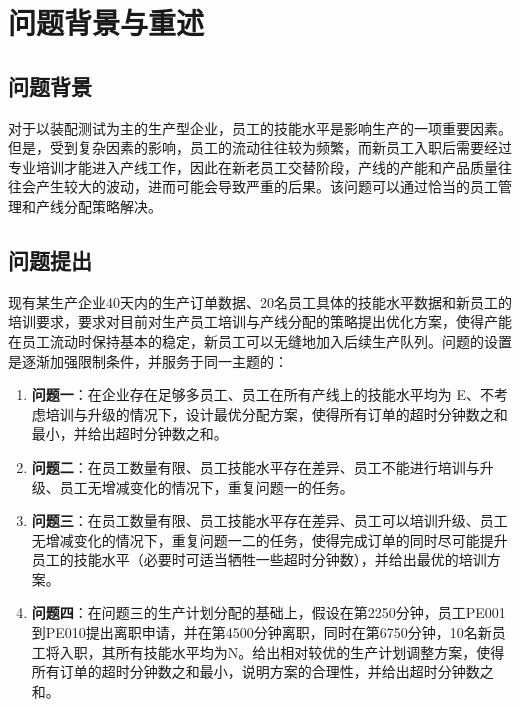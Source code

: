 \section{问题背景与重述}

\subsection{问题背景}
对于以装配测试为主的生产型企业，员工的技能水平是影响生产的一项重要因素。但是，受到复杂因素的影响，员工的流动往往较为频繁，而新员工入职后需要经过专业培训才能进入产线工作，因此在新老员工交替阶段，产线的产能和产品质量往往会产生较大的波动，进而可能会导致严重的后果。该问题可以通过恰当的员工管理和产线分配策略解决。

\subsection{问题提出}
现有某生产企业40天内的生产订单数据、20名员工具体的技能水平数据和新员工的培训要求，要求对目前对生产员工培训与产线分配的策略提出优化方案，使得产能在员工流动时保持基本的稳定，新员工可以无缝地加入后续生产队列。问题的设置是逐渐加强限制条件，并服务于同一主题的：

\begin{enumerate}[label=(\arabic*)]
    \item \textbf{问题一}：在企业存在足够多员工、员工在所有产线上的技能水平均为 E、不考虑培训与升级的情况下，设计最优分配方案，使得所有订单的超时分钟数之和最小，并给出超时分钟数之和。
    \item \textbf{问题二}：在员工数量有限、员工技能水平存在差异、员工不能进行培训与升级、员工无增减变化的情况下，重复问题一的任务。
    \item \textbf{问题三}：在员工数量有限、员工技能水平存在差异、员工可以培训升级、员工无增减变化的情况下，重复问题一二的任务，使得完成订单的同时尽可能提升员工的技能水平（必要时可适当牺牲一些超时分钟数），并给出最优的培训方案。
    \item \textbf{问题四}：在问题三的生产计划分配的基础上，假设在第2250分钟，员工PE001到PE010提出离职申请，并在第4500分钟离职，同时在第6750分钟，10名新员工将入职，其所有技能水平均为N。给出相对较优的生产计划调整方案，使得所有订单的超时分钟数之和最小，说明方案的合理性，并给出超时分钟数之和。
\end{enumerate}